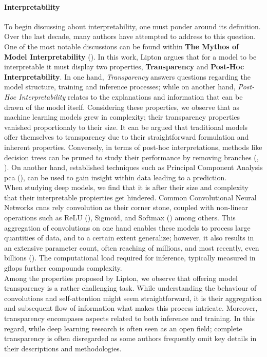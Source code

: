 \paragraph{Interpretability}
To begin discussing about interpretability, one must ponder around its definition. 
Over the last decade, many authors have attempted to address to this question. One 
of the most notable discussions can be found within \textbf{The Mythos of Model Interpretability} 
(\cite{mythos_interp}). In this work, Lipton argues that for a model to be interpretable it must display 
two properties, \textbf{Transparency} and \textbf{Post-Hoc Interpretability}. In one hand, 
\textit{Transparency} answers questions regarding the model structure, training and inference 
processes; while on another hand, \textit{Post-Hoc Interpretability} relates to the explanations 
and information that can be drawn of the model itself.
\noindent Considering these properties, we observe that as machine learning models grew in complexity; 
their transparency properties vanished  
proportionaly to their size. It can be argued that traditional models offer themselves to  
transparency due to their straightforward formulation and inherent properties. Conversely, 
in terms of post-hoc interpretations, methods like decision trees \cite{breiman2017classification} 
can be pruned to study their performance by removing branches (\cite{lakkaraju2016interpretable},
\cite{mothilal2020explaining}). 
On another hand, established techniques such as Principal Component Analysis \gls{pca} 
(\cite{wold1987principal}), can be used to gain insight within data leading to a prediction.\\

\noindent When studying deep models, we find that it is after their size and complexity that their 
interpretable propierties get hindered. Common Convolutional Neural Networks \glspl{cnn} 
rely convolution as their corner stone, coupled with non-linear operations such as 
ReLU (\cite{fukushima1975cognitron}), Sigmoid, and Softmax (\cite{hopfield1985neural}) among others.
This aggregation of convolutions on one hand enables these models to process large quantities of 
data, and to a certain extent generalize; however, it also results in an extensive parameter count,
often reaching of millions, and most recently, even billions (\cite{openai_compute}). The 
computational load required for inference, typically measured in \gls{gflops} further compounds 
complexity.\\

\noindent Among the properties proposed by Lipton, we observe that offering model transparency is a 
rather challenging task. While understanding the behaviour of convolutions and 
self-attention might seem straightforward, it is their aggregation and subsequent flow of information what 
makes this process intricate. Moreover, transparency encompases aspects related to both
inference and training. In this regard, while deep learning research is often seen as an open field;
complete transparency is often disregarded as some authors frequently omit key details in their 
descriptions and methodologies. 

